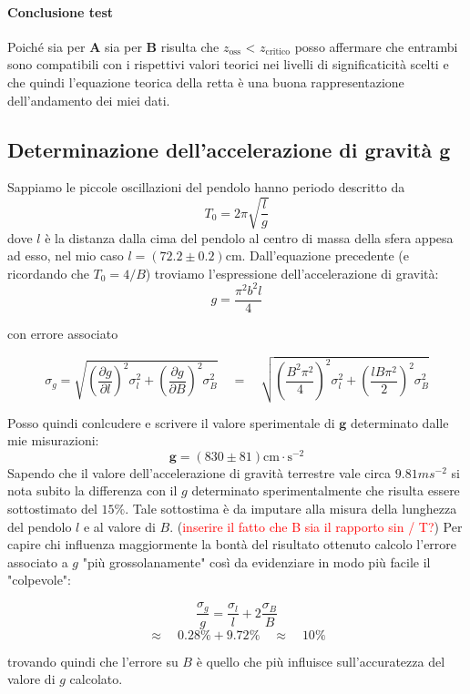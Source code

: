 \documentclass{article}
\begin{document}
	\paragraph{Conclusione test} Poiché sia per $\mathbf{A}$ sia per $\mathbf{B}$ risulta che $z_{\text{oss}}$ < $z_{\text{critico}}$ posso affermare che entrambi sono compatibili con i rispettivi valori teorici nei livelli di significaticità scelti e che quindi l'equazione teorica della retta è una buona rappresentazione dell'andamento dei miei dati.
	
	\subsection{Determinazione dell'accelerazione di gravità g}
	Sappiamo le piccole oscillazioni del pendolo hanno periodo descritto da
	\[
	T_0 = 2\pi \sqrt{\frac{l}{g}} 
	\]
	dove $l$ è la distanza dalla cima del pendolo al centro di massa della sfera appesa ad esso, nel mio caso $l = (72.2 \pm 0.2)$cm. Dall'equazione precedente (e ricordando che $T_0 = 4/B$) troviamo l'espressione dell'accelerazione di gravità:
	\[
	g = \frac{\pi^2b^2l}{4}
	\]
	
	con errore associato
	
	\[
	\sigma_g = \sqrt{\left(\frac{\partial g}{\partial l} \right)^2\sigma_l^2 + \left(\frac{\partial g}{\partial B} \right)^2 \sigma_B^2}  \quad = \quad 	\sqrt{\left(\frac{B^2\pi^2}{4}\right)^2 \sigma_l^2 + \left( \frac{lB\pi^2}{2}  \right)^2 \sigma_B^2}	 
	\]
	
	
	\noindent
	Posso quindi conlcudere e scrivere il valore sperimentale di $\mathbf{g}$ determinato dalle mie misurazioni:
	\[
	\mathbf{g} = (830 \pm 81)\text{cm}\cdot \text{s}^{-2}
	\]
	\noindent
	Sapendo che il valore dell'accelerazione di gravità terrestre vale circa $9.81ms^{-2}$ si nota subito la differenza con il $g$ determinato sperimentalmente che risulta essere sottostimato del $15\%$. Tale sottostima è da imputare alla misura della lunghezza del pendolo $l$ e al valore di $B$. (\textcolor{red}{inserire il fatto che B sia il rapporto sin / T?}) Per capire chi influenza maggiormente la bontà del risultato ottenuto calcolo l'errore associato a $g$ "più grossolanamente" così da evidenziare in modo più facile il "colpevole":
	
	\[
	\frac{\sigma_g}{g} = \frac{\sigma_l}{l} + 2\frac{\sigma_B}{B} 
	\]
	\[
	\approx \quad 0.28 \% + 9.72 \% \quad \approx  \quad 10\%	
	\]
	
	trovando quindi che l'errore su $B$ è quello che più influisce sull'accuratezza del valore di $g$ calcolato.
	\\
	
\end{document}
